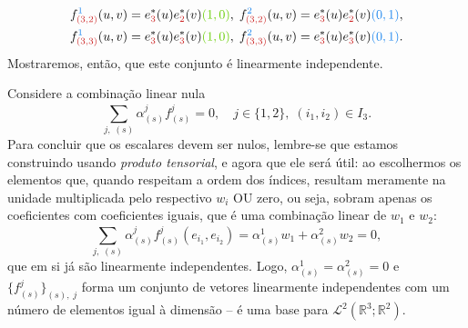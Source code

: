 \documentclass[../differential_forms.tex]{subfiles}
\begin{document}
\begin{example}
\begin{align*}
		 & f_{{\color{Firebrick3}(3, 2)}}^{{\color{DodgerBlue2}1}}(u, v) = e_{{\color{Firebrick3}3}}^{*}(u)e_{{\color{Firebrick3}2}}^{*}(v){\color{Chartreuse3}(1, 0)},\; f_{{\color{Firebrick3}(3, 2)}}^{{\color{DodgerBlue2}2}}(u, v) = e_{{\color{Firebrick3}3}}^{*}(u)e_{{\color{Firebrick3}2}}^{*}(v){\color{DodgerBlue2}(0, 1)}, \\
		 & f_{{\color{Firebrick3}(3, 3)}}^{{\color{DodgerBlue2}1}}(u, v) = e_{{\color{Firebrick3}3}}^{*}(u)e_{{\color{Firebrick3}3}}^{*}(v){\color{Chartreuse3}(1, 0)},\; f_{{\color{Firebrick3}(3, 3)}}^{{\color{DodgerBlue2}2}}(u, v) = e_{{\color{Firebrick3}3}}^{*}(u)e_{{\color{Firebrick3}3}}^{*}(v){\color{DodgerBlue2}(0, 1)}.
	\end{align*}
	Mostraremos, então, que este conjunto é linearmente independente.

	Considere a combinação linear nula
	\[
		\sum\limits_{j,\; (s)}^{}\alpha_{(s)}^{j}f_{(s)}^{j} = 0, \quad j\in \{1, 2\},\; (i_1, i_2)\in I_3.
	\]
	Para concluir que os escalares devem ser nulos, lembre-se que estamos construindo usando \textit{produto tensorial}, e agora que ele será útil: ao escolhermos os elementos que, quando respeitam a ordem dos índices, resultam meramente na unidade multiplicada pelo respectivo \(w_{i}\) OU zero, ou seja, sobram apenas os coeficientes
	com coeficientes iguais, que é uma combinação linear de \(w_1\) e \(w_2\):
	\[
		\sum\limits_{j,\; (s)}^{}\alpha_{(s)}^{j}f_{(s)}^{j}(e_{i_1}, e_{i_2}) = \alpha_{(s)}^{1}w_1 + \alpha_{(s)}^{2}w_2 = 0,
	\]
	que em si já são linearmente independentes. Logo, \(\alpha_{(s)}^{1} = \alpha_{(s)}^{2} = 0\) e \(\{f_{(s)}^{j}\}_{(s),\; j}\) forma um conjunto de vetores linearmente independentes com um número de elementos igual à dimensão -- é uma base para \(\mathcal{L}^{2}(\mathbb{R}^{3}; \mathbb{R}^{2})\).
\end{example}
\end{document}
